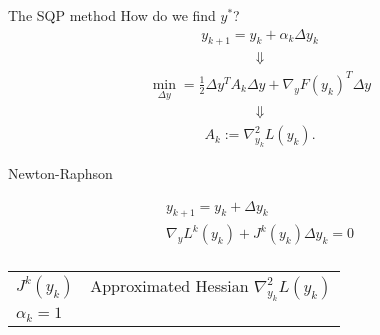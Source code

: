 \begin{frame}{The SQP method}
How do we find $y^*$?
\begin{align*}
  y_{k+1} = y_{k} + \alpha_{k} \Delta y_{k}
\end{align*}
\begin{align*}
\Downarrow
\end{align*}
\begin{align*}
\min_{\Delta y} = \frac{1}{2} \Delta y^T A_k \Delta y + \nabla_y F(y_k)^T \Delta y
\end{align*}
\begin{align*}
\Downarrow
\end{align*}
\begin{align*}
A_{k} := \nabla^{2}_{y_k} L(y_k).
\end{align*}
  
\end{frame}

\begin{frame}{Newton-Raphson}
\begin{block}{}
\begin{gather*}
y_{k+1} = y_k + \Delta y_k \\
\nabla_{y} L^{k}(y_{k}) + J^{k}(y_{k}) \Delta y_{k} = 0 \\
\end{gather*}
\end{block}
\vspace{1em}
\begin{tabular}{l l}
  $J^k(y_k)$ & Approximated Hessian $\nabla^{2}_{y_k} L(y_k)$ \\
  $\alpha_k = 1$ & 
\end{tabular}
\end{frame}

